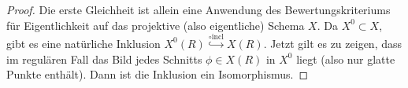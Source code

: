 \documentclass[german]{scrreprt}
\begin{document}
\begin{Satz}
  \begin{proof}
  Die erste Gleichheit ist allein eine Anwendung des
  Bewertungskriteriums für Eigentlichkeit auf das projektive (also
  eigentliche) Schema $X$.
    Da $X^0\subset X$, gibt es eine natürliche Inklusion
    $X^0(R)\overset{\circ \text{incl}}{\hookrightarrow} X(R)$.
    Jetzt gilt es zu zeigen, dass im regulären Fall das Bild jedes
    Schnitts $\phi\in X(R)$ in $X^0$ liegt (also nur glatte Punkte
    enthält). Dann ist die Inklusion ein Isomorphismus.


\end{proof}
\end{Satz}
\end{document}
